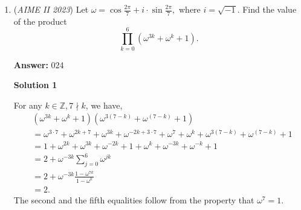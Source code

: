 \begin{enumerate}
 \[\textit{\underline{Case 2: \textbf{One red pair}}}\]

 \[\text{The red pair has }\binom{6}{1}\text{ positions. All the rest still have two ways. Therefore, there are }\binom{6}{1}\cdot 2^5=\frac{6}{1}\dot 2^5=6\cdot 32=\boxed{192} \text{ ways in this case.}\]

 \[\textit{\underline{Case 3: \textbf{One blue pair}}}\]

 \[\text{This is the same as the one red pair case so there are still }\binom{6}{1}\cdot 2^5=6\cdot 2^5=6\cdot 32=\boxed{192}\text{ ways.}\]

 \[\textit{\underline{Case 4: \textbf{One pair of each color}}}\]

 \[\text{The red pair has }\binom{6}{1}\text{ positions. The blue pair has }\binom{5}{1}\text{ positions. All the rest still have two ways. Therefore, there are }\binom{6}{1}\cdot\binom{5}{1}\cdot 2^4=\frac{6\cdot 5=30}{1\cdot 1=1}\cdot 2^4=30\cdot 16=\boxed{480}\text{ ways in this case.}\]

 \[\textit{\underline{\textbf{Solution}}}\]

 \[\text{In total, there are }64+192+192+480=\boxed{928}\text{ways.}\]



	\item (\textit{AIME II 2023}) Let $\omega = \cos\frac{2\pi}{7} + i \cdot \sin\frac{2\pi}{7},$ where $i = \sqrt{-1}.$ Find the value of the product 
 \[\prod_{k=0}^6 \left(\omega^{3k} + \omega^k + 1\right).\]

 \textbf{Answer: }024



\textbf{Solution 1}

For any $k\in \mathbb{Z}, 7\nmid k$, we have,
 \begin{align*} & \left( \omega^{3k} + \omega^k + 1 \right) \left( \omega^{3\left( 7 - k \right)} + \omega^{\left( 7 - k \right)} + 1 \right) \\ & = \omega^{3 \cdot 7} + \omega^{2k + 7} + \omega^{3k} + \omega^{-2k + 3 \cdot 7} + \omega^7 + \omega^k + \omega^{3\left( 7 - k \right)} + \omega^{\left( 7 - k \right)} + 1 \\ & = 1 + \omega^{2k} + \omega^{3k} + \omega^{-2k} + 1 + \omega^k + \omega^{-3k} + \omega^{-k} + 1 \\ & = 2 + \omega^{-3k} \sum_{j=0}^6 \omega^{j k} \\ & = 2 + \omega^{-3k} \frac{1 - \omega^{7 k}}{1 - \omega^k} \\ & = 2 . \end{align*}
The second and the fifth equalities follow from the property that $\omega^7 = 1$.


\end{enumerate}
